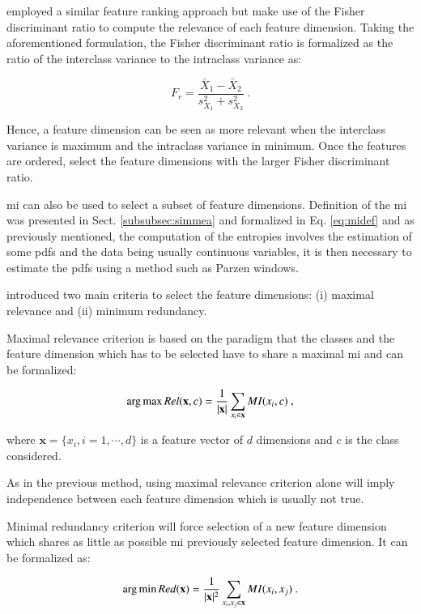 \cite{Vos2012} employed a similar feature ranking approach but make use of the Fisher discriminant ratio to compute the relevance of each feature dimension. Taking the aforementioned formulation, the Fisher discriminant ratio is formalized as the ratio of the interclass variance to the intraclass variance as:

\begin{equation}
F_r = \frac{\bar{X}_1 - \bar{X}_2}{s^{2}_{X_1}+s^{2}_{X_2}} \ .
\label{eq:fisherratio}
\end{equation}

Hence, a feature dimension can be seen as more relevant when the interclass variance is maximum and the intraclass variance in minimum. Once the features are ordered, \cite{Vos2012} select the feature dimensions with the larger Fisher discriminant ratio.

\ac{mi} can also be used to select a subset of feature dimensions. Definition of the \ac{mi} was presented in Sect. \ref{subsubsec:simmea} and formalized in Eq. \eqref{eq:midef} and as previously mentioned, the computation of the entropies involves the estimation of some \acp{pdf} and the data being usually continuous variables, it is then necessary to estimate the \acp{pdf} using a method such as Parzen windows.

\cite{Peng2005} introduced two main criteria to select the feature dimensions: (i) maximal relevance and (ii) minimum redundancy.

Maximal relevance criterion is based on the paradigm that the classes and the feature dimension which has to be selected have to share a maximal \ac{mi} and can be formalized:

\begin{equation}
	\operatorname*{arg\,max} Rel(\mathbf{x},c) = \frac{1}{|\mathbf{x}|} \sum_{x_i \in \mathbf{x}} MI(x_i,c)  \ , 
	\label{eq:mRel}
\end{equation}

\noindent where $\mathbf{x} = \{x_i,i=1,\cdots,d\}$ is a feature vector of $d$ dimensions and $c$ is the class considered.

As in the previous method, using maximal relevance criterion alone will imply independence between each feature dimension which is usually not true.

Minimal redundancy criterion will force selection of a new feature dimension which shares as little as possible \ac{mi} previously selected feature dimension. It can be formalized as:

\begin{equation}
	\operatorname*{arg\,min} Red(\mathbf{x}) = \frac{1}{|\mathbf{x}|^2} \sum_{x_i,x_j \in \mathbf{x}} MI(x_i,x_j)  \ . 
	\label{eq:mRed}
\end{equation}

